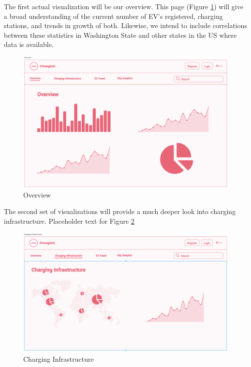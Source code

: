\documentclass{article}
\begin{document}
The first actual visualization will be our overview.  This page (Figure \ref{fig:overview}) will give a
broad understanding of the current number of EV's registered, charging stations,
and trends in growth of both.  Likewise, we intend to include correlations
between these statistics in Washington State and other states in the US where
data is available.
\begin{figure}[h]
    \centering
    \includegraphics[scale=0.25]{Overview}
    \caption{Overview}
    \label{fig:overview}
\end{figure}

The second set of visualizations will provide a much deeper look into charging
infrastructure.  Placeholder text for Figure \ref{fig:charge}
\begin{figure}[h]
    \centering
    \includegraphics[scale=0.25]{Charging Infrastructure}
    \caption{Charging Infrastructure}
    \label{fig:charge}
\end{figure}
\end{document}
